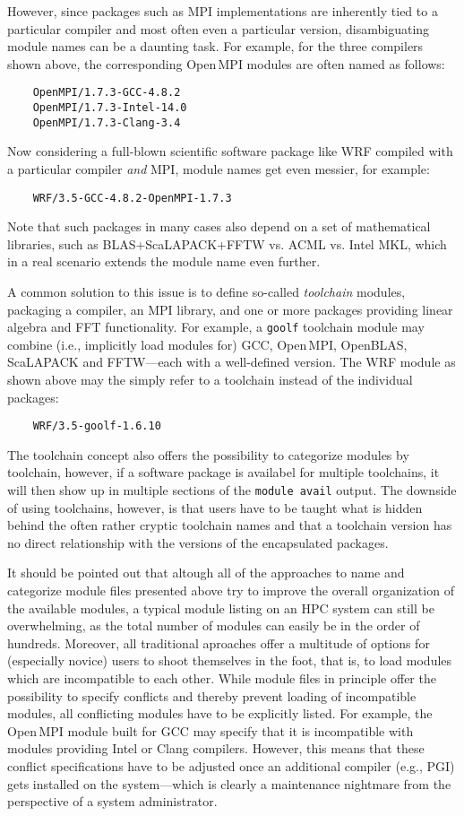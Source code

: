 However, since packages such as MPI implementations are inherently tied to a
particular compiler and most often even a particular version, disambiguating
module names can be a daunting task. For example, for the three compilers
shown above, the corresponding Open\,MPI modules are often named as follows:
\begin{verbatim}
    OpenMPI/1.7.3-GCC-4.8.2
    OpenMPI/1.7.3-Intel-14.0
    OpenMPI/1.7.3-Clang-3.4
\end{verbatim}

Now considering a full-blown scientific software package like WRF compiled
with a particular compiler \emph{and} MPI, module names get even messier,
for example:
\begin{verbatim}
    WRF/3.5-GCC-4.8.2-OpenMPI-1.7.3
\end{verbatim}
Note that such packages in many cases also depend on a set of mathematical
libraries, such as BLAS+ScaLAPACK+FFTW vs. ACML vs. Intel MKL, which in a
real scenario extends the module name even further.

A common solution to this issue is to define so-called \emph{toolchain}
modules, packaging a compiler, an MPI library, and one or more packages
providing linear algebra and FFT functionality. For example, a \texttt{goolf}
toolchain module may combine (i.e., implicitly load modules for) GCC,
Open\,MPI, OpenBLAS, ScaLAPACK and FFTW---each with a well-defined version. The
WRF module as shown above may the simply refer to a toolchain instead of the
individual packages:
\begin{verbatim}
    WRF/3.5-goolf-1.6.10
\end{verbatim}
The toolchain concept also offers the possibility to categorize modules by
toolchain, however, if a software package is availabel for multiple
toolchains, it will then show up in multiple sections of the \texttt{module
avail} output. The downside of using toolchains, however, is that users have
to be taught what is hidden behind the often rather cryptic toolchain names
and that a toolchain version has no direct relationship with the versions of
the encapsulated packages.

It should be pointed out that altough all of the approaches to name and
categorize module files presented above try to improve the overall
organization of the available modules, a typical module listing on an HPC
system can still be overwhelming, as the total number of modules can easily
be in the order of hundreds. Moreover, all traditional aproaches offer a
multitude of options for (especially novice) users to shoot themselves in the
foot, that is, to load modules which are incompatible to each other. While
module files in principle offer the possibility to specify conflicts and
thereby prevent loading of incompatible modules, all conflicting modules have
to be explicitly listed. For example, the Open\,MPI module built for GCC may
specify that it is incompatible with modules providing Intel or Clang
compilers. However, this means that these conflict specifications have to be
adjusted once an additional compiler (e.g., PGI) gets installed on the
system---which is clearly a maintenance nightmare from the perspective of a
system administrator.

